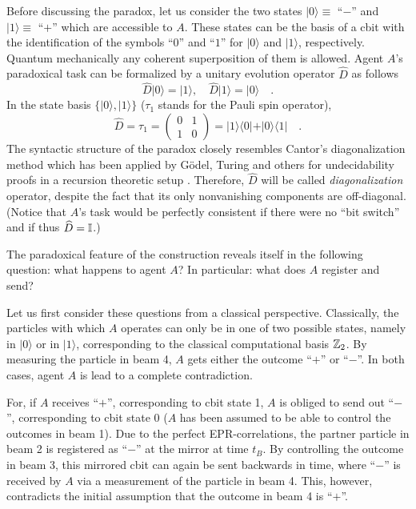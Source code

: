 Before discussing the paradox, let us consider the two states
$\vert 0\rangle \equiv$ ``$-$''
and
$\vert 1\rangle \equiv$ ``$+$'' which are accessible to $A$.
These states can be the basis of a cbit with the identification
of the
symbols ``$0$'' and ``$1$'' for
$\vert 0\rangle$
and
$\vert 1\rangle $,
 respectively.
Quantum mechanically any coherent superposition of them is allowed.
Agent $A$'s paradoxical task can be formalized
by a unitary evolution operator
$
\widehat{D}
$ as follows
\begin{equation}
\widehat{D} \vert 0\rangle  = \vert 1\rangle , \quad
\widehat{D} \vert 1\rangle  = \vert 0\rangle \quad .
\end{equation}
In the state basis $\{ \vert 0\rangle , \vert 1\rangle \}$
($\tau_1$ stands for the Pauli spin operator),
\begin{equation}
\widehat{D}=
\tau_1 =
\left(
\begin{array}{cc}
0 & 1\\
1 & 0
\end{array}
\right) =\vert 1\rangle \langle 0\vert
+ \vert 0\rangle \langle 1\vert    \quad .
\end{equation}
The syntactic structure of the
paradox closely resembles Cantor's  diagonalization me\-thod
which has been
applied by G\"odel, Turing and others for undecidability proofs in a
recursion theoretic setup \cite{davis,rogers,odi:89,svozil-93}.
Therefore,
$
\widehat{D}
$
will be called
{\em diagonalization} operator,
despite the fact that its only nonvanishing components are
off-diagonal.
(Notice that $A$'s task would be perfectly consistent if
there were no ``bit switch'' and if thus
$
\widehat{D} =
{\Bbb I}
$.)

The paradoxical feature of the construction reveals itself in the
following question: what happens to agent $A$?
In particular: what does $A$ register and send?

Let us first consider these questions from a classical perspective.
Classically, the particles with which $A$ operates can only be in one of
two possible
states, namely in $\vert 0\rangle $ or in $\vert 1\rangle $, corresponding to
the classical computational basis ${\Bbb Z}_2$.
By measuring the particle in beam 4, $A$ gets either the outcome ``$+$''
or ``$-$''.
In both cases, agent $A$ is lead to a complete
contradiction.

For, if $A$
receives ``$+$'', corresponding to cbit state 1,
$A$ is obliged to send out ``$-$'',
corresponding to cbit state
0
($A$ has been assumed to be able to control the outcomes in beam 1).
Due to the perfect EPR-correlations, the
partner particle in beam
2 is registered as
``$-$'' at the mirror at time $t_B$. By controlling the outcome in beam
3, this mirrored cbit can again be sent backwards in time, where ``$-$''
is received by
$A$ via a measurement of the particle in beam 4. This, however,
contradicts
the initial assumption that the outcome in beam 4 is ``$+$''.

